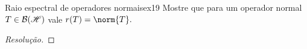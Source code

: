 \begin{exercício}{Raio espectral de operadores normais}{ex19}
  Mostre que para um operador normal \(T \in \mathcal{B}(\mathscr{H})\) vale \(r(T) = \norm{T}.\)
\end{exercício}
\begin{proof}[Resolução]

\end{proof}
